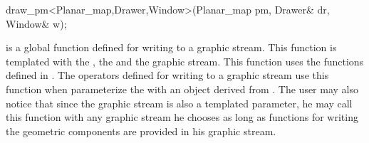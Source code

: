 
\ccRefPageBegin


\begin{ccRefFunction}{draw_pm<Planar_map,Drawer,Window>(Planar_map pm, Drawer& dr, Window& w);}
    

\ccDefinition
{} is a global function defined for writing  to a graphic stream. 
This function is templated with the , the  and the graphic stream.  
This function uses the functions defined in .
The operators defined for writing  to a graphic stream use this 
function when parameterize the  with an object derived from 
. 
The user may also notice that since the graphic stream is also 
a templated parameter, he may call this function with any graphic 
stream he chooses as long as functions for writing the geometric 
components are provided in his graphic stream.


\end{ccRefFunction} %

\ccRefPageEnd











